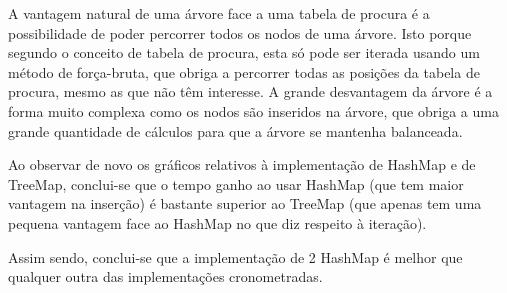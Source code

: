 \documentclass[a5paper,twocolumn, 11pt]{article}
\begin{document}
A vantagem natural de uma árvore face a uma tabela de procura é a possibilidade de poder percorrer todos os nodos de uma árvore. Isto porque segundo o conceito de tabela de procura, esta só pode ser iterada usando um método de força-bruta, que obriga a percorrer todas as posições da tabela de procura, mesmo as que não têm interesse.
A grande desvantagem da árvore é a forma muito complexa como os nodos são inseridos na árvore, que obriga a uma grande quantidade de cálculos para que a árvore se mantenha balanceada.

Ao observar de novo os gráficos relativos à implementação de HashMap e de TreeMap, conclui-se que o tempo ganho ao usar HashMap (que tem maior vantagem na inserção) é bastante superior ao TreeMap (que apenas tem uma pequena vantagem face ao HashMap no que diz respeito à iteração).

Assim sendo, conclui-se que a implementação de 2 HashMap é melhor que qualquer outra das implementações cronometradas.
\end{document}
